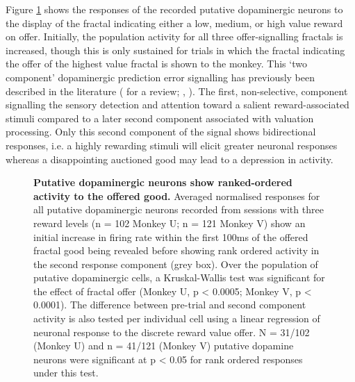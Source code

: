 Figure \ref{fig:fractal_display} shows the responses of the recorded putative dopaminergic neurons to the display of the fractal indicating either a low, medium, or high value reward on offer. Initially, the population activity for all three offer-signalling fractals is increased, though this is only sustained for trials in which the fractal indicating the offer of the highest value fractal is shown to the monkey. This ‘two component' dopaminergic prediction error signalling has previously been described in the literature (\cite{schultzDopamineRewardPredictionerror2016} for a review; \cite{nomotoTemporallyExtendedDopamine2010}, \cite{staufferDopamineRewardPrediction2014}). The first, non-selective, component signalling the sensory detection and attention toward a salient reward-associated stimuli compared to a later second component associated with valuation processing. Only this second component of the signal shows bidirectional responses, i.e. a highly rewarding stimuli will elicit greater neuronal responses whereas a disappointing auctioned good may lead to a depression in activity.

\begin{figure}[htbp!] 
\centering    

\caption[Putative dopaminergic neurons show ranked-ordered activity to the offered good.]{\textbf{Putative dopaminergic neurons show ranked-ordered activity to the offered good.} Averaged normalised responses for all putative dopaminergic neurons recorded from sessions with three reward levels (n = 102 Monkey U; n = 121 Monkey V) show an initial increase in firing rate within the first 100ms of the offered fractal good being revealed before showing rank ordered activity in the second response component (grey box). Over the population of putative dopaminergic cells, a Kruskal-Wallis test was significant for the effect of fractal offer (Monkey U, p < 0.0005; Monkey V, p < 0.0001).  The difference between pre-trial and second component activity is also tested per individual cell using a linear regression of neuronal response to the discrete reward value offer. N = 31/102 (Monkey U) and n = 41/121 (Monkey V) putative dopamine neurons were significant at p < 0.05 for rank ordered responses under this test.}
\label{fig:fractal_display}
\end{figure}

